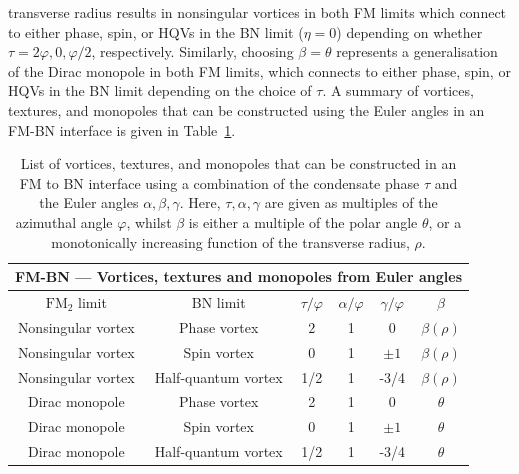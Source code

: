 transverse radius results in nonsingular vortices in both FM limits which
connect to either phase, spin, or HQVs in the BN limit (\(\eta=0\)) depending
on whether \(\tau=2\varphi, 0, \varphi/2\), respectively.
Similarly, choosing \(\beta=\theta\) represents a generalisation of the Dirac
monopole in both FM limits, which connects to either phase, spin, or HQVs in
the BN limit depending on the choice of \(\tau\).
A summary of vortices, textures, and monopoles that can be constructed using
the Euler angles in an FM-BN interface is given in Table~\ref{tab: FM-BN-other}.
\begin{table}
    \centering
    \begin{tabular}{cccccc}
        \toprule
        \multicolumn{6}{c}{FM-BN --- Vortices, textures and monopoles from Euler
            angles} \\
        \midrule
        \(\text{FM}_2\) limit & BN limit & \(\tau/\varphi\) & \(\alpha/\varphi\)
            & \(\gamma/\varphi\) & \(\beta\) \\
        \midrule
        Nonsingular vortex & Phase vortex & \(2\) & 1 & \(0\)
            & \(\beta(\rho)\) \\ 
        Nonsingular vortex & Spin vortex  & \(0\) & 1 & \(\pm 1\)
            & \(\beta(\rho)\) \\ 
        Nonsingular vortex & Half-quantum vortex & 1/2 & 1 & -3/4
            & \(\beta(\rho)\) \\ 
        Dirac monopole & Phase vortex & 2 & 1  & 0 & \(\theta\)\\
        Dirac monopole & Spin vortex & 0 & 1  & \(\pm 1\)
            & \(\theta\)\\
        Dirac monopole & Half-quantum vortex & 1/2 & 1  & -3/4 & \(\theta\) \\
        \bottomrule
    \end{tabular}
    \caption[Examples of monopoles and nonsingular vortex connections across a
    ferromagnetic to biaxial nematic interface.]
    {\label{tab: FM-BN-other}List of vortices, textures, and monopoles
    that can be constructed in an FM to BN interface using a combination
    of the condensate phase \(\tau\) and the Euler angles \(\alpha, \beta,
    \gamma\).
    Here, \(\tau, \alpha, \gamma\) are given as multiples of the azimuthal angle
    \(\varphi\), whilst \(\beta\) is either a multiple of the polar angle
    \(\theta\), or a monotonically increasing function of the transverse radius,
    \(\rho\).}
\end{table}

